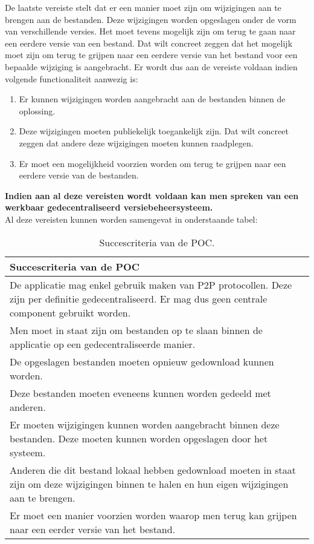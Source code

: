 De laatste vereiste stelt dat er een manier moet zijn om wijzigingen aan te brengen aan de bestanden. Deze wijzigingen worden opgeslagen onder de vorm van verschillende versies. Het moet tevens mogelijk zijn om terug te gaan naar een eerdere versie van een bestand. Dat wilt concreet zeggen dat het mogelijk moet zijn om terug te grijpen naar een eerdere versie van het bestand voor een bepaalde wijziging is aangebracht. Er wordt dus aan de vereiste voldaan indien volgende functionaliteit aanwezig is:

\begin{enumerate}
\item Er kunnen wijzigingen worden aangebracht aan de bestanden binnen de oplossing.
\item Deze wijzigingen moeten publiekelijk toegankelijk zijn. Dat wilt concreet zeggen dat andere deze wijzigingen moeten kunnen raadplegen.
\item Er moet een mogelijkheid voorzien worden om terug te grijpen naar een eerdere versie van de bestanden. 
\end{enumerate}

\textbf{Indien aan al deze vereisten wordt voldaan kan men spreken van een werkbaar gedecentraliseerd versiebeheersysteem.}\\

Al deze vereisten kunnen worden samengevat in onderstaande tabel:
\begin{table}[h!]
	\centering
	\begin{tabular}{ |p{14cm}|}
 		\hline
 		\large \textbf{Succescriteria van de POC} \\
 		\hline
 		De applicatie mag enkel gebruik maken van P2P protocollen. Deze zijn per definitie gedecentraliseerd. Er mag dus geen centrale component gebruikt worden.\\
 		\hline 
 		Men moet in staat zijn om bestanden op te slaan binnen de applicatie op een gedecentraliseerde manier.\\
 		\hline
 		De opgeslagen bestanden moeten opnieuw gedownload kunnen worden.\\
 		\hline
		Deze bestanden moeten eveneens kunnen worden gedeeld met anderen.\\
 		\hline
 		Er moeten wijzigingen kunnen worden aangebracht binnen deze bestanden. Deze moeten kunnen worden opgeslagen door het systeem.\\
 		\hline
 		Anderen die dit bestand lokaal hebben gedownload moeten in staat zijn om deze wijzigingen binnen te halen en hun eigen wijzigingen aan te brengen.\\
 		\hline
 		Er moet een manier voorzien worden waarop men terug kan grijpen naar een eerder versie van het bestand.\\
 		\hline
 	\end{tabular}
	\label{suc_crit}
	\caption{Succescriteria van de POC.}
\end{table}
\newpage
